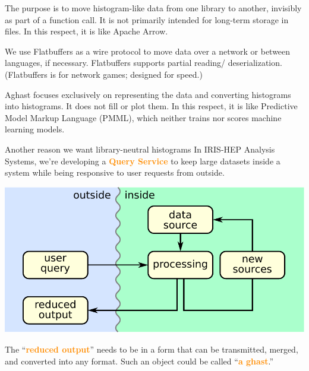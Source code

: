 \documentclass[aspectratio=169]{beamer}
\begin{document}
\begin{frame}{}
\vspace{1.25 cm}
\begin{description}\setlength{\itemsep}{0.5 cm}
\item[in-memory:] The purpose is to move histogram-like data from one library to another, invisibly as part of a function call. It is not primarily intended for long-term storage in files. In this respect, it is like Apache Arrow.

\item[serializable:]<2-> We use Flatbuffers as a wire protocol to move data over a network or between languages, if necessary. Flatbuffers supports partial reading/ deserialization. (Flatbuffers is for network games; designed for speed.)

\item[ontology:]<3-> Aghast focuses exclusively on representing the data and converting histograms into histograms. It does not fill or plot them. In this respect, it is like Predictive Model Markup Language (PMML), which neither trains nor scores machine learning models.
\end{description}
\end{frame}

\begin{frame}{Another reason we want library-neutral histograms}
\vspace{0.5 cm}
\large
In IRIS-HEP Analysis Systems, we're developing a \textcolor{darkorange}{\bf Query Service} to keep large datasets inside a system while being responsive to user requests from outside.

\begin{center}
\includegraphics[width=0.6\linewidth]{basic-block-diagram.pdf}
\end{center}

The ``\textcolor{darkorange}{\bf reduced output}'' needs to be in a form that can be transmitted, merged, and converted into any format. Such an object could be called ``\textcolor{darkorange}{\bf a ghast}.''
\end{frame}
\end{document}
